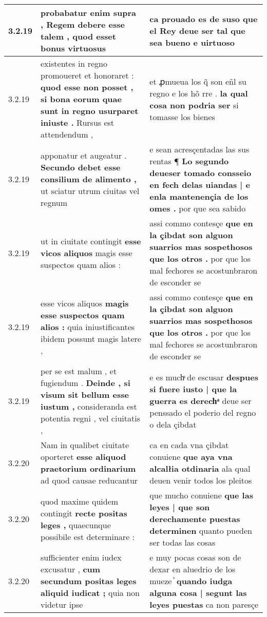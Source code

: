 \begin{tabular}{|p{1cm}|p{6.5cm}|p{6.5cm}|}
3.2.19 & probabatur enim supra , \textbf{ Regem debere esse talem , } quod esset bonus virtuosus & ca prouado es de suso \textbf{ que el Rey deue ser } tal que sea bueno e uirtuoso \\\hline
3.2.19 & existentes in regno promoueret et honoraret : \textbf{ quod esse non posset , si bona eorum quae sunt in regno usurparet iniuste . } Rursus est attendendum , & et ꝓmueua los q̃ son eñl su regno e los hõ rre . \textbf{ la qual cosa non podria ser } si tomasse los bienes \\\hline
3.2.19 & apponatur et augeatur . \textbf{ Secundo debet esse consilium de alimento , } ut sciatur utrum ciuitas vel regnum & e sean acresçentadas las sus rentas ¶ \textbf{ Lo segundo deueser tomado consseio en fech delas uiandas | e enla mantenençia de los omes . } por que sea sabido \\\hline
3.2.19 & ut in ciuitate contingit \textbf{ esse vicos aliquos } magis esse suspectos quam alios : & assi commo contesçe \textbf{ que en la çibdat son alguon suarrios mas sospethosos que los otros . } por que los mal fechores se acostunbraron de esconder se \\\hline
3.2.19 & esse vicos aliquos \textbf{ magis esse suspectos quam alios : } quia iniustificantes ibidem possunt magis latere , & assi commo contesçe \textbf{ que en la çibdat son alguon suarrios mas sospethosos que los otros . } por que los mal fechores se acostunbraron de esconder se \\\hline
3.2.19 & per se est malum , et fugiendum . \textbf{ Deinde , si visum sit bellum esse iustum , } consideranda est potentia regni , vel ciuitatis , & e es muchͣ de escusar \textbf{ despues si fuere iusto | que la guerra es derechͣ } deue ser penssado el poderio del regno o dela çibdat \\\hline
3.2.20 & Nam in qualibet ciuitate oporteret \textbf{ esse aliquod praetorium ordinarium } ad quod causae reducantur & ca en cada vna çibdat conuiene \textbf{ que aya vna alcalłia otdinaria } ala qual deuen venir todos los pleitos \\\hline
3.2.20 & quod maxime quidem contingit \textbf{ recte positas leges , } quaecunque possibile est determinare : & que mucho conuiene \textbf{ que las leyes | que son derechamente puestas determinen } quanto pueden ser todas las cosas \\\hline
3.2.20 & sufficienter enim iudex excusatur , \textbf{ cum secundum positas leges aliquid iudicat ; } quia non videtur ipse & e muy pocas cosas son de dexar en aluedrio de los mueze ᷤ \textbf{ quando iudga alguna cosa | segunt las leyes puestas } ca non paresçe \\\hline

\end{tabular}
